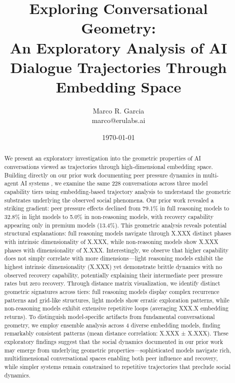 \documentclass[11pt,letterpaper]{article}
\title{Exploring Conversational Geometry: \\
\large An Exploratory Analysis of AI Dialogue Trajectories Through Embedding Space}
\author{
Marco R. Garcia \\
marco@erulabs.ai
}
\date{\today}
\newcommand{\totalConversations}{228}
\newcommand{\fullReasoningPeerPressure}{79.1\%}
\newcommand{\lightReasoningPeerPressure}{32.8\%}
\newcommand{\nonReasoningPeerPressure}{5.0\%}
\newcommand{\fullReasoningRecovery}{13.4\%}
\newcommand{\fullIntrinsicDim}{X.XXX}
\newcommand{\lightIntrinsicDim}{X.XXX}
\newcommand{\nonIntrinsicDim}{X.XXX}
\newcommand{\fullPhaseCount}{X.XXX}
\newcommand{\nonPhaseCount}{X.XXX}
\newcommand{\nonLoops}{XXX.X}
\newcommand{\ensembleModels}{4}
\newcommand{\ensembleDistanceCorr}{X.XXX}
\newcommand{\ensembleDistanceCorrStd}{X.XXX}
\begin{document}
\maketitle

\begin{abstract}
We present an exploratory investigation into the geometric properties of AI conversations viewed as trajectories through high-dimensional embedding space. Building directly on our prior work documenting peer pressure dynamics in multi-agent AI systems \citep{garcia2025peer}, we examine the same \totalConversations{} conversations across three model capability tiers using embedding-based trajectory analysis to understand the geometric substrates underlying the observed social phenomena. Our prior work revealed a striking gradient: peer pressure effects declined from \fullReasoningPeerPressure{} in full reasoning models to \lightReasoningPeerPressure{} in light models to \nonReasoningPeerPressure{} in non-reasoning models, with recovery capability appearing only in premium models (\fullReasoningRecovery{}). This geometric analysis reveals potential structural explanations: full reasoning models navigate through \fullPhaseCount{} distinct phases with intrinsic dimensionality of \fullIntrinsicDim{}, while non-reasoning models show \nonPhaseCount{} phases with dimensionality of \nonIntrinsicDim{}. Interestingly, we observe that higher capability does not simply correlate with more dimensions—light reasoning models exhibit the highest intrinsic dimensionality (\lightIntrinsicDim{}) yet demonstrate brittle dynamics with no observed recovery capability, potentially explaining their intermediate peer pressure rates but zero recovery. Through distance matrix visualization, we identify distinct geometric signatures across tiers: full reasoning models display complex recurrence patterns and grid-like structures, light models show erratic exploration patterns, while non-reasoning models exhibit extensive repetitive loops (averaging \nonLoops{} embedding returns). To distinguish model-specific artifacts from fundamental conversational geometry, we employ ensemble analysis across \ensembleModels{} diverse embedding models, finding remarkably consistent patterns (mean distance correlation: \ensembleDistanceCorr{} ± \ensembleDistanceCorrStd{}). These exploratory findings suggest that the social dynamics documented in our prior work may emerge from underlying geometric properties—sophisticated models navigate rich, multidimensional conversational spaces enabling both peer influence and recovery, while simpler systems remain constrained to repetitive trajectories that preclude social dynamics.
\end{abstract}
\end{document}
